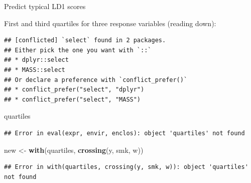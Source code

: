 \documentclass[ignorenonframetext,]{beamer}
\newenvironment{Shaded}{\begin{snugshade}}{\end{snugshade}}
\newcommand{\FloatTok}[1]{\textcolor[rgb]{0.00,0.00,0.81}{#1}}
\newcommand{\KeywordTok}[1]{\textcolor[rgb]{0.13,0.29,0.53}{\textbf{#1}}}
\newcommand{\NormalTok}[1]{#1}
\newcommand{\OperatorTok}[1]{\textcolor[rgb]{0.81,0.36,0.00}{\textbf{#1}}}
\newcommand{\StringTok}[1]{\textcolor[rgb]{0.31,0.60,0.02}{#1}}
\begin{document}
\begin{frame}[fragile]{Predict typical LD1 scores}
\protect\hypertarget{predict-typical-ld1-scores}{}

First and third quartiles for three response variables (reading down):

\begin{Shaded}
\end{Shaded}

\begin{verbatim}
## [conflicted] `select` found in 2 packages.
## Either pick the one you want with `::` 
## * dplyr::select
## * MASS::select
## Or declare a preference with `conflict_prefer()`
## * conflict_prefer("select", "dplyr")
## * conflict_prefer("select", "MASS")
\end{verbatim}

\begin{Shaded}
\begin{Highlighting}[]
\NormalTok{quartiles}
\end{Highlighting}
\end{Shaded}

\begin{verbatim}
## Error in eval(expr, envir, enclos): object 'quartiles' not found
\end{verbatim}

\begin{Shaded}
\begin{Highlighting}[]
\NormalTok{new <-}\StringTok{ }\KeywordTok{with}\NormalTok{(quartiles, }\KeywordTok{crossing}\NormalTok{(y, smk, w))}
\end{Highlighting}
\end{Shaded}

\begin{verbatim}
## Error in with(quartiles, crossing(y, smk, w)): object 'quartiles' not found
\end{verbatim}

\end{frame}
\end{document}
